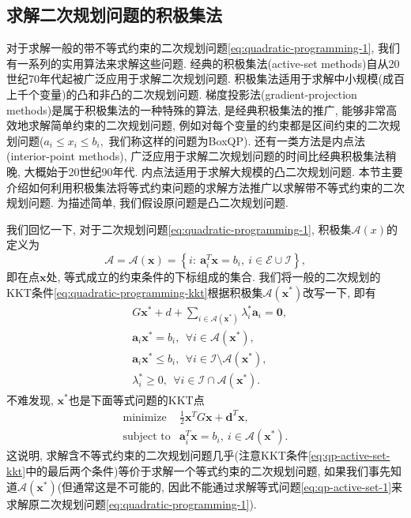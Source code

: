 \documentclass{SBCbookchapter}
\newcommand{\V}[1]{{\bm{#1}}}
\numberwithin{equation}{section}
\begin{document}
\subsection{求解二次规划问题的积极集法}
\label{subsec:7.2.2}

对于求解一般的带不等式约束的二次规划问题\eqref{eq:quadratic-programming-1}, 我们有一系列的实用算法来求解这些问题. 经典的积极集法(active-set methods)自从20世纪70年代起被广泛应用于求解二次规划问题. 积极集法适用于求解中小规模(成百上千个变量)的凸和非凸的二次规划问题. 梯度投影法(gradient-projection methods)是属于积极集法的一种特殊的算法, 是经典积极集法的推广, 能够非常高效地求解简单约束的二次规划问题, 例如对每个变量的约束都是区间约束的二次规划问题($a_i \leqslant x_i \leqslant b_i,$ 我们称这样的问题为BoxQP). 还有一类方法是内点法(interior-point methods), 广泛应用于求解二次规划问题的时间比经典积极集法稍晚, 大概始于20世纪90年代. 内点法适用于求解大规模的凸二次规划问题. 本节主要介绍如何利用积极集法将等式约束问题的求解方法推广以求解带不等式约束的二次规划问题. 为描述简单, 我们假设原问题是凸二次规划问题.

我们回忆一下, 对于二次规划问题\eqref{eq:quadratic-programming-1}, 积极集$\mathcal{A}(x)$的定义为
\begin{equation}
\label{eq:qp-active-set}
\mathcal{A} = \mathcal{A}(\V{x}) = \left\{ i : ~ \V{a}_i^T \V{x} = b_i, ~ i \in \mathcal{E} \cup \mathcal{I} \right\},
\end{equation}
即在点$\V{x}$处, 等式成立的约束条件的下标组成的集合. 我们将一般的二次规划的KKT条件\eqref{eq:quadratic-programming-kkt}根据积极集$\mathcal{A}(\V{x}^*)$改写一下, 即有
\begin{equation}
\label{eq:qp-active-set-kkt}
\begin{aligned}
& G \V{x}^* + d + \sum\limits_{i \in \mathcal{A}(\V{x}^*)} \lambda_i^* \V{a}_i = \V{0}, \\
& \V{a}_i \V{x}^* = b_i, ~~ \forall i \in \mathcal{A}(\V{x}^*), \\
& \V{a}_i \V{x}^* \leqslant b_i, ~~ \forall i \in \mathcal{I} \setminus \mathcal{A}(\V{x}^*), \\
& \lambda_i^* \geqslant 0, ~~ \forall i \in \mathcal{I} \cap \mathcal{A}(\V{x}^*).
\end{aligned}
\end{equation}
不难发现, $\V{x}^*$也是下面等式问题的KKT点
\begin{equation}
\label{eq:qp-active-set-1}
\begin{array}{cl}
\text{minimize} & \frac{1}{2} \V{x}^T G \V{x} + \V{d}^T \V{x}, \\
\text{subject to} & \V{a}_i^T \V{x} = b_i, ~ i \in \mathcal{A}(\V{x}^*).
\end{array}
\end{equation}
这说明, 求解含不等式约束的二次规划问题几乎(注意KKT条件\eqref{eq:qp-active-set-kkt}中的最后两个条件)等价于求解一个等式约束的二次规划问题, 如果我们事先知道$\mathcal{A}(\V{x}^*)$(但通常这是不可能的, 因此不能通过求解等式问题\eqref{eq:qp-active-set-1}来求解原二次规划问题\eqref{eq:quadratic-programming-1}).
\end{document}
